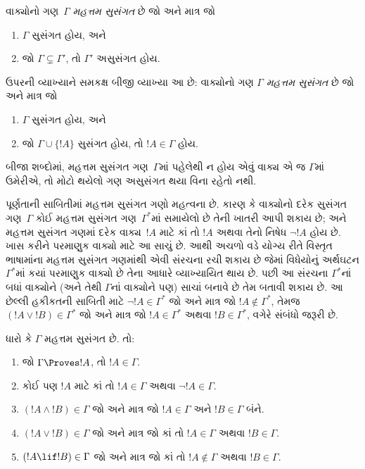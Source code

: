 \begin{defn}[મહત્તમ સુસંગત ગણ]
વાક્યોનો ગણ~$\Gamma$ \emph{મહત્તમ સુસંગત} છે જો અને માત્ર જો
\begin{enumerate}
\item $\Gamma$ સુસંગત હોય, અને
\item જો $\Gamma \subsetneq \Gamma'$, તો $\Gamma'$ અસુસંગત હોય.
\end{enumerate}
\end{defn}

\begin{explain}
ઉપરની વ્યાખ્યાને સમકક્ષ
બીજી વ્યાખ્યા આ છે:
વાક્યોનો ગણ $\Gamma$
\emph{મહત્તમ સુસંગત} છે
જો અને માત્ર જો
\begin{enumerate}
\item $\Gamma$ સુસંગત હોય, અને
\item જો $\Gamma \cup \{ !A \}$ સુસંગત હોય,
તો $!A \in \Gamma$ હોય.
\end{enumerate}
બીજા શબ્દોમાં, મહત્તમ સુસંગત
ગણ~$\Gamma$માં પહેલેથી ન
હોય એવું વાક્ય એ જ $\Gamma$માં ઉમેરીએ,
તો મોટો થયેલો ગણ
અસુસંગત થયા વિના રહેતો નથી.
\end{explain}

\begin{explain}
પૂર્ણતાની સાબિતીમાં મહત્તમ સુસંગત
ગણો મહત્વના છે. કારણ કે
વાક્યોનો દરેક સુસંગત
ગણ~$\Gamma$ કોઈ મહત્તમ
સુસંગત ગણ~$\Gamma^*$માં
સમાયેલો છે તેની ખાતરી
આપી શકાય છે; અને
મહત્તમ સુસંગત ગણમાં
દરેક વાક્ય~$!A$
માટે કાં તો $!A$ અથવા
તેનો નિષેધ $\lnot !A$
હોય છે. ખાસ કરીને
પરમાણુક વાક્યો
માટે આ સાચું છે.
આથી અચળો વડે
યોગ્ય રીતે વિસ્તૃત
ભાષામાંના મહત્તમ
સુસંગત ગણમાંથી
એવી સંરચના
રચી શકાય છે જેમાં
વિધેયોનું અર્થઘટન
$\Gamma^*$માં કયાં
પરમાણુક વાક્યો
છે તેના આધારે
વ્યાખ્યાયિત થાય છે.
પછી આ સંરચના
$\Gamma^*$નાં બધાં
વાક્યોને
(અને તેથી $\Gamma$નાં
વાક્યોને પણ) સાચાં
બનાવે છે તેમ બતાવી
શકાય છે. આ છેલ્લી
હકીકતની સાબિતી માટે
$\lnot !A \in
\Gamma^*$ જો અને માત્ર જો
$!A \notin \Gamma^*$,
તેમજ $(!A \lor !B) \in \Gamma^*$
જો અને માત્ર જો
$!A \in \Gamma^*$ અથવા
$!B \in \Gamma^*$,
વગેરે સંબંધો જરૂરી છે.
\end{explain}

\begin{prop}
ધારો કે $\Gamma$ મહત્તમ સુસંગત છે. તો:
\begin{enumerate}
\item {} જો $\Gamma \Proves !A$, તો $!A \in
  \Gamma$.

\item {} કોઈ પણ $!A$ માટે
  કાં તો $!A \in \Gamma$ અથવા $\lnot !A \in \Gamma$.

\item {} $(!A \land !B) \in \Gamma$
  જો અને માત્ર જો $!A \in \Gamma$ અને $!B \in \Gamma$ બંને.

\item {} $(!A \lor !B) \in \Gamma$
  જો અને માત્ર જો કાં તો $!A \in \Gamma$ અથવા $!B \in \Gamma$.

\item {} $(!A \lif !B) \in \Gamma$
  જો અને માત્ર જો કાં તો $!A \notin \Gamma$ અથવા $!B \in \Gamma$.
\end{enumerate}
\end{prop}

